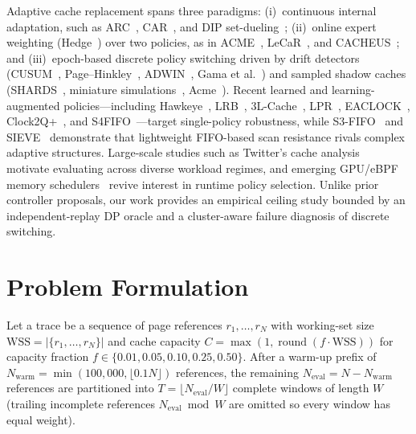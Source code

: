 \documentclass[10pt,twocolumn]{article}
\begin{document}
Adaptive cache replacement spans three paradigms: (i)~continuous internal adaptation, such as ARC~\cite{arc}, CAR~\cite{car}, and DIP set-dueling~\cite{dip}; (ii)~online expert weighting (Hedge~\cite{hedge}) over two policies, as in ACME~\cite{acme02}, LeCaR~\cite{lecar}, and CACHEUS~\cite{cacheus}; and (iii)~epoch-based discrete policy switching driven by drift detectors (CUSUM~\cite{page}, Page--Hinkley~\cite{page}, ADWIN~\cite{adwin}, Gama et al.~\cite{gama}) and sampled shadow caches (SHARDS~\cite{shards}, miniature simulations~\cite{mini}, Acme~\cite{acme}). Recent learned and learning-augmented policies---including Hawkeye~\cite{hawkeye}, LRB~\cite{lrb}, 3L-Cache~\cite{l3cache}, LPR~\cite{lpr}, EACLOCK~\cite{eaclock}, Clock2Q+~\cite{clock2q}, and S4FIFO~\cite{s4fifo}---target single-policy robustness, while S3-FIFO~\cite{s3fifo} and SIEVE~\cite{sieve} demonstrate that lightweight FIFO-based scan resistance rivals complex adaptive structures. Large-scale studies such as Twitter's cache analysis~\cite{twitter} motivate evaluating across diverse workload regimes, and emerging GPU/eBPF memory schedulers~\cite{msched,gpuext} revive interest in runtime policy selection. Unlike prior controller proposals, our work provides an empirical ceiling study bounded by an independent-replay DP oracle and a cluster-aware failure diagnosis of discrete switching.

\section{Problem Formulation}
\label{sec:problem}

Let a trace be a sequence of page references $r_1, \dots, r_N$ with working-set size $\text{WSS} = |\{r_1,\dots,r_N\}|$ and cache capacity $C = \max(1, \operatorname{round}(f \cdot \text{WSS}))$ for capacity fraction $f \in \{0.01, 0.05, 0.10, 0.25, 0.50\}$. After a warm-up prefix of $N_{\text{warm}} = \min(100{,}000, \lfloor 0.1 N \rfloor)$ references, the remaining $N_{\text{eval}} = N - N_{\text{warm}}$ references are partitioned into $T = \lfloor N_{\text{eval}} / W \rfloor$ complete windows of length $W$ (trailing incomplete references $N_{\text{eval}} \bmod W$ are omitted so every window has equal weight).
\end{document}
